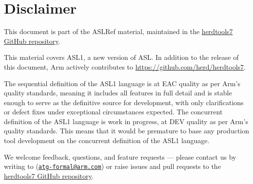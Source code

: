 \chapter{Disclaimer}

This document is part of the ASLRef material, maintained in the
\href{https://github.com/herd/herdtools7}{herdtools7 GitHub repository}.

This material covers ASL1, a new version of ASL.
In addition to the release of this document, Arm actively contributes to
\url{https://github.com/herd/herdtools7}.

The sequential definition of the ASL1 language is at EAC quality as per Arm’s quality standards, meaning it includes all features in full detail and is stable enough to serve as the definitive source for development, with only clarifications or defect fixes under exceptional circumstances expected.
The concurrent definition of the ASL1 language is work in progress, at DEV quality as per Arm's quality standards.
This means that it would be premature to base any production tool development on the concurrent definition of the ASL1 language.

We welcome feedback, questions, and feature requests — please contact us by writing
to (\href{mailto:atg-formal@arm.com}{\tt atg-formal@arm.com}) or raise issues and
pull requests to the \href{https://github.com/herd/herdtools7}{herdtools7 GitHub repository}.
